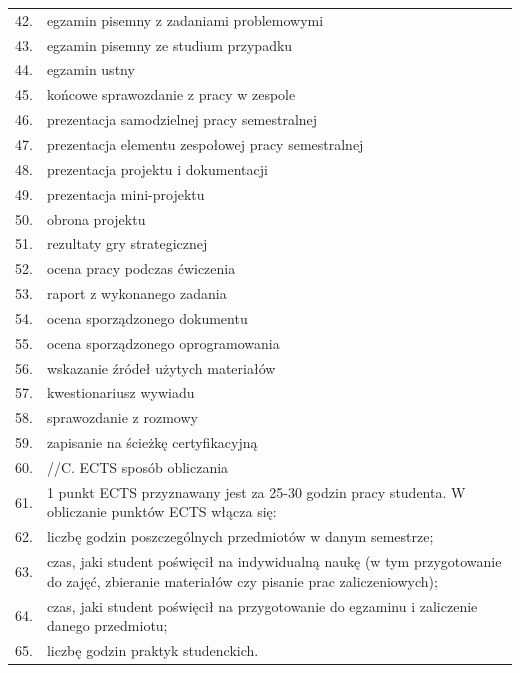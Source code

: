 \documentclass[12pt, a4paper]{article}
\begin{document}
{\begin{longtable}{m{1.5cm}m{14.5cm}}
  \rowcolor{tableRowAlt} 42. & egzamin pisemny z zadaniami problemowymi \\
  \rowcolor{tableRowLight} 43. & egzamin pisemny ze studium przypadku \\
  \rowcolor{tableRowAlt} 44. & egzamin ustny \\
  \rowcolor{tableRowLight} 45. & końcowe sprawozdanie z pracy w zespole \\
  \rowcolor{tableRowAlt} 46. & prezentacja samodzielnej pracy semestralnej \\
  \rowcolor{tableRowLight} 47. & prezentacja elementu zespołowej pracy semestralnej \\
  \rowcolor{tableRowAlt} 48. & prezentacja projektu i dokumentacji \\
  \rowcolor{tableRowLight} 49. & prezentacja mini-projektu \\
  \rowcolor{tableRowAlt} 50. & obrona projektu \\
  \rowcolor{tableRowLight} 51. & rezultaty gry strategicznej \\
  \rowcolor{tableRowAlt} 52. & ocena pracy podczas ćwiczenia \\
  \rowcolor{tableRowLight} 53. & raport z wykonanego zadania \\
  \rowcolor{tableRowAlt} 54. & ocena sporządzonego dokumentu \\
  \rowcolor{tableRowLight} 55. & ocena sporządzonego oprogramowania \\
  \rowcolor{tableRowAlt} 56. & wskazanie źródeł użytych materiałów \\
  \rowcolor{tableRowLight} 57. & kwestionariusz wywiadu \\
  \rowcolor{tableRowAlt} 58. & sprawozdanie z rozmowy \\
  \rowcolor{tableRowLight} 59. & zapisanie na ścieżkę certyfikacyjną \\
  \rowcolor{tableRowAlt} 60. & //C. ECTS sposób obliczania \\
  \rowcolor{tableRowLight} 61. & 1 punkt ECTS przyznawany jest za 25-30 godzin pracy studenta. W obliczanie punktów ECTS włącza się: \\
  \rowcolor{tableRowAlt} 62. & liczbę godzin poszczególnych przedmiotów w danym semestrze; \\
  \rowcolor{tableRowLight} 63. & czas, jaki student poświęcił na indywidualną naukę (w tym przygotowanie do zajęć, zbieranie materiałów czy pisanie prac zaliczeniowych); \\
  \rowcolor{tableRowAlt} 64. & czas, jaki student poświęcił na przygotowanie do egzaminu i zaliczenie danego przedmiotu; \\
  \rowcolor{tableRowLight} 65. & liczbę godzin praktyk studenckich. \\
\bottomrule
\end{longtable}}
\end{document}
